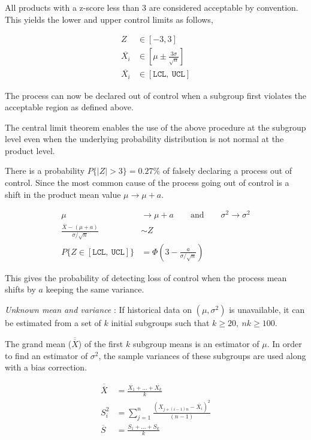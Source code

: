 All products with a z-score less than 3 are considered acceptable by convention. This yields the lower and upper control limits as follows,

\begin{align}
	Z &\in [-3, 3] \\
	\overline{X_i} &\in \left[ \mu \pm \frac{3\sigma}{\sqrt{n}} \right] \\
	\overline{X_i} &\in [\texttt{LCL},\ \texttt{UCL}]
\end{align}

The process can now be declared out of control when a subgroup first violates the acceptable region as defined above.

The central limit theorem enables the use of the above procedure at the subgroup level even when the underlying probability distribution is not normal at the product level.

There is a probability $ P\{|Z| > 3\} = 0.27\% $ of falsely declaring a process out of control. Since the most common cause of the process going out of control is a shift in the product mean value $ \mu \to \mu + a $.

\begin{align}
	\mu &\to \mu + a \qquad \text{and} \qquad \sigma^2 \to \sigma^2 \\
	\frac{\overline{X} - (\mu + a)}{\sigma/\sqrt{n}} &\sim Z \\
	P\{Z \in \left[\texttt{LCL},\ \texttt{UCL}\right]\} &= \Phi\left(3 - \frac{a}{\sigma/\sqrt{n}}\right)
\end{align}

This gives the probability of detecting loss of control when the process mean shifts by $ a $ keeping the same variance.

\textit{Unknown mean and variance} : If historical data on $ (\mu, \sigma^2) $ is unavailable, it can be estimated from a set of $ k $ initial subgroups such that $ k \geq 20,\ nk \geq 100 $.

The grand mean ($ \overline{\overline{X}} $) of the first $ k $ subgroup means is an estimator of $ \mu $. In order to find an estimator of $ \sigma^2 $, the sample variances of these subgroups are used along with a bias correction.

\begin{align}
	\overline{\overline{X}} &= \frac{\overline{X_1} + \dots + \overline{X_k}}{k} \\
	S_i^2 &= \sum\limits_{j = 1}^{n} \frac{(X_{j + (i-1)n} - \overline{X_i})^2}{(n-1)} \\
	\overline{S} &= \frac{S_1 + \dots + S_k}{k}
\end{align}


